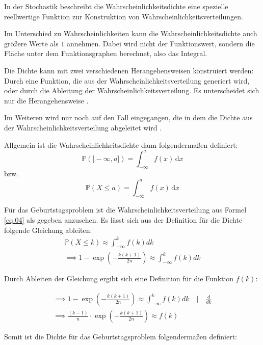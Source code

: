 \documentclass[../main.tex]{subfiles}
\begin{document}
\begin{flushleft}
In der Stochastik beschreibt die Wahrscheinlichkeitsdichte eine spezielle reellwertige Funktion zur Konstruktion von Wahrscheinlichkeitsverteilungen.

Im Unterschied zu Wahrscheinlichkeiten kann die Wahrscheinlichkeitsdichte auch größere Werte als $1$ annehmen. Dabei wird nicht der Funktionswert, sondern die Fläche unter dem Funktionsgraphen berechnet, also das Integral.

Die Dichte kann mit zwei verschiedenen Herangehensweisen konstruiert werden: Durch eine Funktion, die aus der Wahrscheinlichkeitsverteilung generiert wird, oder durch die Ableitung der Wahrscheinlichkeitsverteilung. Es unterscheidet sich nur die Herangehensweise  \cite[560ff]{henze}. 

Im Weiteren wird nur noch auf den Fall eingegangen, die in dem die Dichte aus der Wahrscheinlichkeitsverteilung abgeleitet wird  \cite[22ff]{georgii}. \newline

Allgemein ist die Wahrscheinlichkeitsdichte dann folgendermaßen definiert:
\begin{equation}
\mathbb{P}(]-\infty, a])= \int_{-\infty}^a f(x) \, \mathrm d x
\end{equation}
bzw.
\begin{equation}
\mathbb{P}(X \leq a)= \int_{-\infty}^a f(x) \,\mathrm d x
\end{equation}

Für das Geburtstagsproblem ist die Wahrscheinlichkeitsverteilung aus Formel \ref{eq:04} als gegeben anzusehen. Es lässt sich aus der Definition für die Dichte folgende Gleichung ableiten:
\begin{eqnarray}
\mathbb{P}(X \leq k) \approx \int_{ -\infty }^{ k }{ f(k) dk } \\
\implies 1 - \exp( - \frac{ k (k + 1) }{ 2n } ) \approx \int_{ -\infty }^{ k }{ f(k) dk }
\end{eqnarray}


Durch Ableiten der Gleichung ergibt sich eine Definition für die Funktion $f(k)$:

\begin{eqnarray}
\implies 1 - \exp( - \frac{ k (k + 1) }{ 2n } ) \approx \int_{ -\infty }^{ k }{ f(k) dk } \quad | \quad \frac{ d }{ dk }\\
\implies \frac{ (k-1) }{ n } \cdot \exp( - \frac{ k (k + 1) }{ 2n } ) \approx f(k)
\end{eqnarray}

Somit ist die Dichte für das Geburtstagsproblem folgendermaßen definiert:


\end{flushleft}
\end{document}
